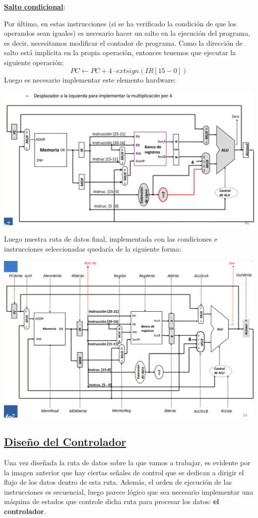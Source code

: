 \documentclass[a4paper,10pt]{book}
\begin{document}
\underline{\textbf{Salto condicional}}:

Por último, en estas instrucciones (si se ha verificado la condición de que los operandos sean iguales) es necesario hacer un salto en la ejecución del programa, es decir, necesitamos modificar el contador de programa. Como la dirección de salto está implícita en la propia operación, entonces tenemos que ejecutar la siguiente operación:
$$PC \leftarrow PC + 4\cdot extsign(IR[15-0	])$$
Luego es necesario implementar este elemento hardware:
\begin{center}
\includegraphics[scale=0.6]{escritura salto condicional}
\end{center}
Luego nuestra ruta de datos final, implementada con las condiciones e instrucciones seleccionadas quedaría de la siguiente forma:
\begin{center}
\includegraphics[scale=0.6]{ruta de datos MIPS}
\end{center}

\subsection*{\underline{Diseño del Controlador}}
Una vez diseñada la ruta de datos sobre la que vamos a trabajar, es evidente por la imagen anterior que hay ciertas señales de control que se dedican a dirigir el flujo de los datos dentro de esta ruta. Además, el orden de ejecución de las instrucciones es secuencial, luego parece lógico que sea necesario implementar una máquina de estados que controle dicha ruta para procesar los datos: \textbf{el controlador}.
\end{document}
